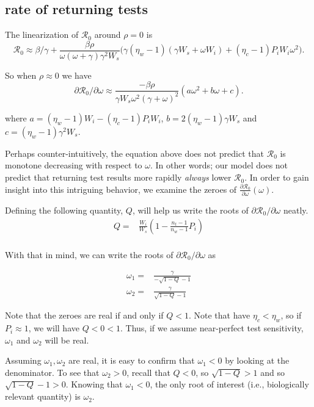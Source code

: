 \documentclass[12pt]{article}
\newcommand{\Rnum}{\mathcal{R}_0}
\theoremstyle{definition} %
\begin{document}
\subsection{rate of returning tests}
The linearization of $\Rnum$ around $\rho=0$ is
\begin{equation}\label{linearization}
\Rnum \approx \beta/\gamma + \frac{\beta \rho}{\omega (\omega+\gamma) \gamma^2 W_s} \Big(\gamma(\eta_w-1)(\gamma W_s+\omega W_i) + (\eta_c -1)P_iW_i \omega^2 \Big). 
\end{equation}

So when $\rho \approx 0$ we have $$\partial{\Rnum}/\partial{\omega} \approx  \frac{-\beta \rho}{\gamma W_s\omega^2 (\gamma+\omega)^2}  (a \omega^2 + b \omega + c).$$

where $a=(\eta_w-1)W_i-(\eta_c-1)P_iW_i$, $b=2(\eta_w-1)\gamma W_s$ and $c=(\eta_w-1)\gamma^2 W_s$. 

Perhaps counter-intuitively, the equation above does not predict that $\Rnum$ is monotone decreasing with respect to $\omega$. In other words; our model does not predict that returning test results more rapidly \textit{always} lower $\Rnum$. In order to gain insight into this intriguing behavior, we examine the zeroes of $\frac{\partial{\Rnum}}{\partial{\omega}}(\omega)$.

Defining the following quantity, $Q$, will help us write the roots of $\partial{\Rnum}/\partial{\omega}$ neatly. 
\begin{align}\label{eq:defQ}
    Q =& \frac{W_i}{W_s}\left(1-\frac{n_{t}-1}{n_{w}-1}P_{i}\right) \\
\end{align}

With that in mind, we can write the roots of $\partial{\Rnum}/\partial{\omega}$ as

\begin{align}
    \omega_1 =& \frac{\gamma}{-\sqrt{1-Q}-1} \\
    \omega_2 =& \frac{\gamma}{\sqrt{1-Q}-1}
\end{align}

Note that the zeroes are real if and only if $Q < 1$. Note that have $\eta_c < \eta_w$, so if $P_i \approx 1$, we will have $Q < 0 < 1$. Thus, if we assume near-perfect test sensitivity, $\omega_1$ and $\omega_2$ will be real. 

Assuming $\omega_1, \omega_2$ are real, it is easy to confirm that $\omega_1 < 0$ by looking at the denominator. To see that $\omega_2 > 0$, recall that $Q < 0$, so $\sqrt{1-Q} > 1$ and so $\sqrt{1-Q} -1 > 0$. Knowing that $\omega_1 < 0$, the only root of interest (i.e., biologically relevant quantity) is $\omega_2$. 
\end{document}
